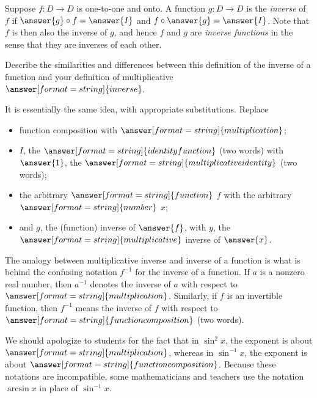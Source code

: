 \documentclass{ximera}
\begin{document}
\begin{definition}
Suppose $f:D\rightarrow D$ is one-to-one and onto.  A function $g:D\rightarrow D$ is the \emph{inverse} of $f$ if $\answer{g}\circ f = \answer{I}$ and $f\circ \answer{g} = \answer{I}$.  Note that $f$ is then also the inverse of $g$, and hence $f$ and $g$ are \emph{inverse functions} in the sense that they are inverses of each other.  
\end{definition}

\begin{question}
Describe the similarities and differences between this definition of the inverse of a function and your definition of multiplicative $\answer[format=string]{inverse}$.  
\begin{question}
It is essentially the same idea, with appropriate substitutions.  Replace 
\begin{itemize}
\item function composition with $\answer[format=string]{multiplication}$; 
\item $I$, the $\answer[format=string]{identity function}$ (two words) with $\answer{1}$, 
    the $\answer[format=string]{multiplicative identity}$ (two words); 
\item the arbitrary $\answer[format=string]{function}$ $f$ with the arbitrary $\answer[format=string]{number}$ $x$;
\item and $g$, the (function) inverse of $\answer{f}$, with $y$, 
    the $\answer[format=string]{multiplicative}$ inverse of $\answer{x}$.  
\end{itemize}
\end{question}
\end{question}

\begin{question}
The analogy between multiplicative inverse and inverse of a function is what is behind the confusing notation $f^{-1}$ for the inverse of a function.  If $a$ is a nonzero real number, then $a^{-1}$ denotes the inverse of $a$ with respect to $\answer[format=string]{multiplication}$.  Similarly, if $f$ is an invertible function, then $f^{-1}$ means the inverse of $f$ with respect to $\answer[format=string]{function composition}$ (two words). 

We should apologize to students for the fact that in $\sin^2 x$, the exponent is about $\answer[format=string]{multiplication}$, whereas in $\sin^{-1} x$, the exponent is about $\answer[format=string]{function composition}$.  Because these notations are incompatible, some mathematicians and teachers use the notation $\arcsin x$ in place of $\sin^{-1}x$.  
\end{question}
\end{document}
